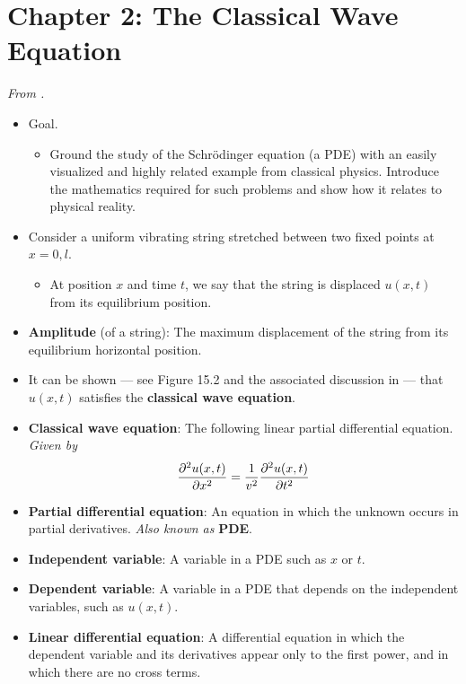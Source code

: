 \documentclass[../notes.tex]{subfiles}
\begin{document}
\section{Chapter 2: The Classical Wave Equation}
\emph{From \textcite{bib:McQuarrieSimon}.}
\begin{itemize}
    \item {}Goal.
    \begin{itemize}
        \item Ground the study of the Schr\"{o}dinger equation (a PDE) with an easily visualized and highly related example from classical physics. Introduce the mathematics required for such problems and show how it relates to physical reality.
    \end{itemize}
    \item Consider a uniform vibrating string stretched between two fixed points at $x=0,l$.
    \begin{itemize}
        \item At position $x$ and time $t$, we say that the string is displaced $u(x,t)$ from its equilibrium position.
    \end{itemize}
    \item \textbf{Amplitude} (of a string): The maximum displacement of the string from its equilibrium horizontal position.
    \item It can be shown --- see Figure 15.2 and the associated discussion in \textcite{bib:PHYS13300Notes} --- that $u(x,t)$ satisfies the \textbf{classical wave equation}.
    \item \textbf{Classical wave equation}: The following linear partial differential equation. \emph{Given by}
    \begin{equation*}
        \pdv[2]{u(x,t)}{x} = \frac{1}{v^2}\pdv[2]{u(x,t)}{t}
    \end{equation*}
    \item \textbf{Partial differential equation}: An equation in which the unknown occurs in partial derivatives. \emph{Also known as} \textbf{PDE}.
    \item \textbf{Independent variable}: A variable in a PDE such as $x$ or $t$.
    \item \textbf{Dependent variable}: A variable in a PDE that depends on the independent variables, such as $u(x,t)$.
    \item \textbf{Linear differential equation}: A differential equation in which the dependent variable and its derivatives appear only to the first power, and in which there are no cross terms.

\end{itemize}
\end{document}
